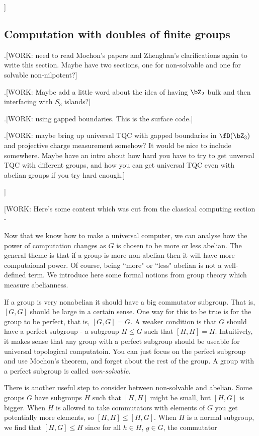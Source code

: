 ]

\subsection{Computation with doubles of finite groups}

.[WORK: need to read Mochon's papers and Zhenghan's clarifications again to write this section. Maybe have two sections, one for non-solvable and one for solvable non-nilpotent?]

.[WORK: Maybe add a little word about the idea of having $\bZ_2$ bulk and then interfacing with $S_3$ islands?]

.[WORK: using gapped boundaries. This is the surface code.]

.[WORK: maybe bring up universal TQC with gapped boundaries in $\fD(\bZ_3)$ and projective charge measurement somehow? It would be nice to include somewhere. Maybe have an intro about how hard you have to try to get unversal TQC with different groups, and how you can get universal TQC even with abelian groups if you try hard enough.]

]

[WORK: Here's some content which was cut from the classical computing section - 

Now that we know how to make a universal computer, we can analyse how the power of computation changes as $G$ is chosen to be more or less abelian. The general theme is that if a group is more non-abelian then it will have more computaional power. Of course, being ``more" or ``less" abelian is not a well-defined term. We introduce here some formal notions from group theory which measure abelianness.

If a group is very nonabelian it should have a big commutator subgroup. That is, $[G,G]$ should be large in a certain sense. One way for this to be true is for the group to be perfect, that is, $[G,G]=G$. A weaker condition is that $G$ should have a perfect subgroup - a subgroup $H\leq G$ such that $[H,H]=H$. Intuitively, it makes sense that any group with a perfect subgroup should be useable for universal topological computatoin. You can just focus on the perfect subgroup and use Mochon's theorem, and forget about the rest of the group. A group with a perfect subgroup is called \textit{non-solvable}.

There is another useful step to consider between non-solvable and abelian. Some groups $G$ have subgroups $H$ such that $[H,H]$ might be small, but $[H,G]$ is bigger. When $H$ is allowed to take commutators with elements of $G$ you get potentially more elements, so $[H,H]\leq [H,G]$. When $H$ is a normal subgroup, we find that $[H,G]\leq H$ since for all $h\in H$, $g\in G$, the commutator


